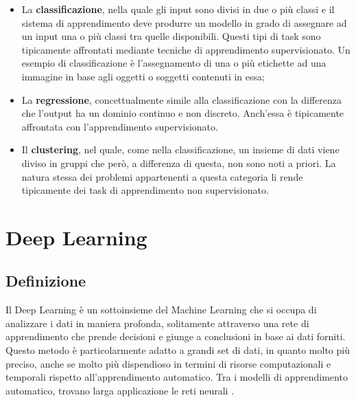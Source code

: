\begin{itemize}
    \item La \textbf{classificazione}, nella quale gli input sono divisi 
    in due o più classi e
    il sistema di apprendimento deve produrre un modello in grado di
    assegnare ad un input una o più classi tra quelle disponibili. Questi tipi
    di task sono tipicamente affrontati mediante tecniche di apprendimento
    supervisionato. Un esempio di classificazione è l’assegnamento di una
    o più etichette ad una immagine in base agli oggetti o soggetti contenuti
    in essa;
    
    \item La \textbf{regressione}, concettualmente simile alla classificazione con la
    differenza che l’output ha un dominio continuo e non discreto.
    Anch'essa è tipicamente affrontata con l’apprendimento supervisionato.

    \item Il \textbf{clustering}, nel quale, come nella classificazione, un insieme di dati
    viene diviso in gruppi che però, a differenza di questa, non sono noti a
    priori. La natura stessa dei problemi appartenenti a questa categoria li
    rende tipicamente dei task di apprendimento non supervisionato.
\end{itemize}


\section{Deep Learning}
\subsection{Definizione}
Il Deep Learning è un sottoinsieme del Machine Learning che si occupa
di analizzare i dati in maniera profonda, solitamente attraverso una rete di
apprendimento che prende decisioni e giunge a conclusioni in base ai dati forniti.
Questo metodo è particolarmente adatto a grandi set di dati, in quanto molto
più preciso, anche se molto più dispendioso in termini di risorse computazionali
e temporali rispetto all’apprendimento automatico.
Tra i modelli di apprendimento automatico, trovano larga applicazione le reti 
neurali \cite{IA_ML_DL, ASPETTI_DEEP_LEARNING, ASPETTI_DEEP_LEARNING_2}.
